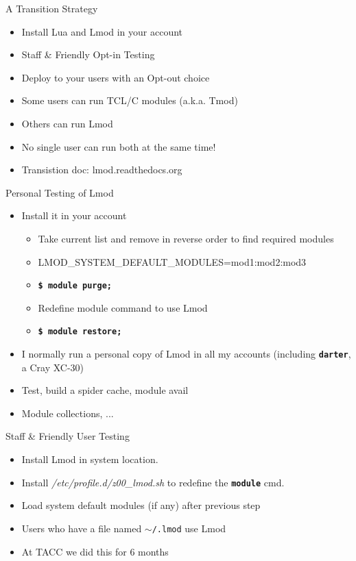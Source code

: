 \documentclass{beamer}
\begin{document}
\begin{frame}{A Transition Strategy}
  \begin{itemize}
    \item Install Lua and Lmod in your account
    \item Staff \& Friendly Opt-in Testing
    \item Deploy to your users with an Opt-out choice
    \item Some users can run TCL/C modules (a.k.a. Tmod)
    \item Others can run Lmod
    \item No single user can run both at the same time!
    \item Transistion doc: lmod.readthedocs.org
  \end{itemize}
\end{frame}

\begin{frame}{Personal Testing of Lmod}
  \begin{itemize}
    \item Install it in your account
      \begin{itemize}
        \item Take current list and remove in reverse order to find
          required modules
        \item LMOD\_SYSTEM\_DEFAULT\_MODULES=mod1:mod2:mod3
        \item \texttt{\bf \$ module purge;}
        \item Redefine module command to use Lmod
        \item \texttt{\bf \$ module restore;} 
      \end{itemize}
    \item I normally run a personal copy of Lmod in all my accounts
      (including \texttt{\bf darter}, a Cray XC-30)
    \item Test, build a spider cache, module avail
    \item Module collections, ...
  \end{itemize}
\end{frame}

\begin{frame}{Staff \& Friendly User Testing}
  \begin{itemize}
    \item Install Lmod in system location.
    \item Install \emph{/etc/profile.d/z00\_lmod.sh} to redefine the
      \texttt{\bf module} cmd.
    \item Load system  default modules (if any) after previous step
    \item Users who have a file named \texttt{$\sim$/.lmod} use Lmod
    \item At TACC we did this for 6 months
  \end{itemize}
\end{frame}
\end{document}

